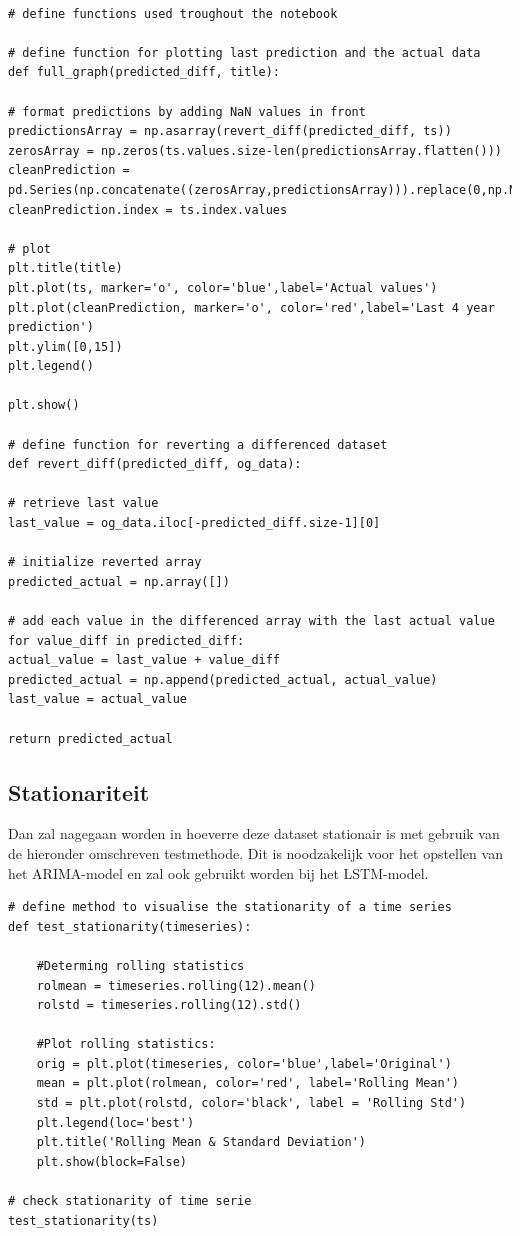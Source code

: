 \begin{verbatim}

# define functions used troughout the notebook

# define function for plotting last prediction and the actual data
def full_graph(predicted_diff, title):

# format predictions by adding NaN values in front
predictionsArray = np.asarray(revert_diff(predicted_diff, ts))
zerosArray = np.zeros(ts.values.size-len(predictionsArray.flatten()))
cleanPrediction = pd.Series(np.concatenate((zerosArray,predictionsArray))).replace(0,np.NaN)
cleanPrediction.index = ts.index.values

# plot
plt.title(title)
plt.plot(ts, marker='o', color='blue',label='Actual values')
plt.plot(cleanPrediction, marker='o', color='red',label='Last 4 year prediction')
plt.ylim([0,15])
plt.legend()

plt.show()

# define function for reverting a differenced dataset
def revert_diff(predicted_diff, og_data):

# retrieve last value
last_value = og_data.iloc[-predicted_diff.size-1][0]

# initialize reverted array
predicted_actual = np.array([])

# add each value in the differenced array with the last actual value
for value_diff in predicted_diff:
actual_value = last_value + value_diff
predicted_actual = np.append(predicted_actual, actual_value)
last_value = actual_value

return predicted_actual
\end{verbatim}

\subsection{Stationariteit}

Dan zal nagegaan worden in hoeverre deze dataset stationair is met gebruik van de hieronder omschreven test\textunderscore methode. Dit is noodzakelijk voor het opstellen van het ARIMA-model en zal ook gebruikt worden bij het LSTM-model.

\begin{verbatim}
# define method to visualise the stationarity of a time series
def test_stationarity(timeseries):

    #Determing rolling statistics
    rolmean = timeseries.rolling(12).mean()
    rolstd = timeseries.rolling(12).std()
    
    #Plot rolling statistics:
    orig = plt.plot(timeseries, color='blue',label='Original')
    mean = plt.plot(rolmean, color='red', label='Rolling Mean')
    std = plt.plot(rolstd, color='black', label = 'Rolling Std')
    plt.legend(loc='best')
    plt.title('Rolling Mean & Standard Deviation')
    plt.show(block=False)

# check stationarity of time serie
test_stationarity(ts)
\end{verbatim}

